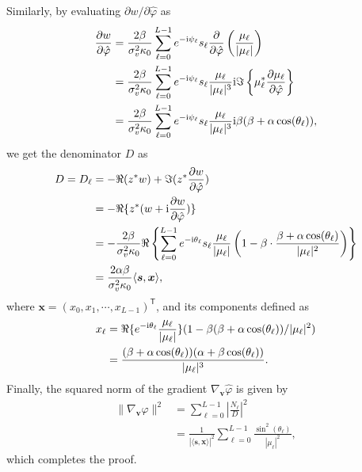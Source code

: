 \documentclass[a4paper,12pt]{article}
\def \T {^{\mathsf{T}}}
\def \ri {{\rm i}}
\begin{document}
Similarly, by evaluating $\partial w/\partial \hat{\varphi}$ as 
\begin{equation}
    \begin{aligned}
    \frac{\partial w}{\partial \hat{\varphi}} &= \frac{2\beta}{\sigma_v^2 \kappa_0} \sum_{\ell=0}^{L-1} e^{-\ri \psi_\ell} s_\ell \frac{\partial}{\partial \hat{\varphi}}\left(\frac{\mu_\ell}{|\mu_\ell|}\right) \\
    &= \frac{2\beta}{\sigma_v^2 \kappa_0} \sum_{\ell=0}^{L-1} e^{-\ri \psi_\ell} s_\ell  \frac{\mu_\ell}{|\mu_\ell|^3} {\ri} \Im \left\{\mu_\ell^* \frac{\partial \mu_\ell}{\partial \hat{\varphi}}  \right\} \\
    &=  \frac{2\beta}{\sigma_v^2 \kappa_0} \sum_{\ell=0}^{L-1} e^{-\ri \psi_\ell} s_\ell  \frac{\mu_\ell}{|\mu_\ell|^3} {\ri} \beta(\beta + \alpha\cos(\theta_\ell)), 
    \end{aligned}
\end{equation}
we get the denominator $D$ as 
\begin{equation}
    \begin{aligned}
    D = D_\ell &= -\Re(z^*w) +\Im(z^* \frac{\partial w}{\partial \hat{\varphi}}) \\
    &= -\Re\{z^*(w+\ri \frac{\partial w}{\partial \hat{\varphi}})\} \\
    &= -\frac{2\beta}{\sigma_v^2 \kappa_0} \Re\left\{ \sum_{\ell=0}^{L-1}e^{-\ri \theta_\ell} s_\ell \frac{\mu_\ell}{|\mu_\ell|}\left( 1-\beta\cdot \frac{\beta+\alpha\cos(\theta_\ell)}{|\mu_\ell|^2} \right) \right\} \\
    &= \frac{2\alpha\beta}{\sigma_v^2 \kappa_0} \langle {\bm s}, {\bm x} \rangle,
    \end{aligned}
\end{equation}
where ${\bm x} = (x_0, x_1, \cdots, x_{L-1})\T$, and its components defined as 
\begin{equation}
    \begin{aligned}
        x_\ell &= \Re\{ e^{-\ri \theta_\ell} \frac{\mu_\ell}{|\mu_\ell|} \}(1- \beta(\beta+\alpha\cos(\theta_\ell))/|\mu_\ell|^2) \\
        &= \frac{(\beta+\alpha\cos(\theta_\ell))(\alpha+\beta\cos(\theta_\ell))}{|\mu_\ell|^3}. 
    \end{aligned}
\end{equation}
Finally, the squared norm of the gradient $\nabla_{\bm v}\hat{\varphi}$ is given by 
\begin{equation}
    \begin{aligned}
    \|\nabla_{\bm v}\hat{\varphi}\|^2 &= \sum_{\ell=0}^{L-1}\left| \frac{N_\ell}{D} \right|^2 \\
    &= \frac{1}{|\langle {\bm s}, {\bm x}\rangle|^2}\sum_{\ell=0}^{L-1}  \frac{\sin^2(\theta_\ell)}{|\mu_\ell|^2},  
    \end{aligned}
\end{equation}
which completes the proof. 
\end{document}
